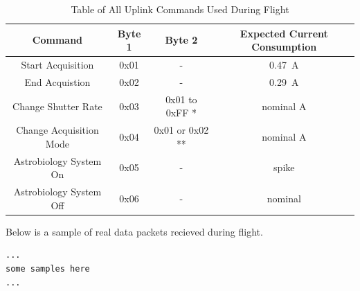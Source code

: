 \begin{table}[h!]
\centering
\caption{Table of All Uplink Commands Used During Flight}
\label{tab:All-Commands}
\bigskip
\begin{tabular}{c|c|c|c}
\hline
\hline
\multicolumn{1}{c|}{\bfseries Command} & \multicolumn{1}{c|}{\bfseries Byte 1} &  \multicolumn{1}{c|}{\bfseries Byte 2} & \multicolumn{1}{c}{\bfseries Expected Current Consumption} \\
\hline
    	Start Acquisition  	& 0x01	& -	 		& \SI{0.47}{\ampere}    \\ \hline
    	End Acquistion 		& 0x02	& -	 		& \SI{0.29}{\ampere}    \\ \hline
    	Change Shutter Rate 	& 0x03 	& 0x01 to 0xFF *	& nominal A 		\\ \hline
	Change Acquisition Mode	& 0x04	& 0x01 or 0x02 **	& nominal A		\\ \hline
	Astrobiology System On	& 0x05	& -			& spike			\\ \hline
	Astrobiology System Off	& 0x06	& -			& nominal		\\ \hline

\end{tabular}
\medskip
\end{table}

Below is a sample of real data packets recieved during flight. 

\lstset{basicstyle=\small, numbers=left, xleftmargin=2em, frame=tb, label = Downlinks, framexleftmargin=1.5em}
\begin{lstlisting}[caption = Sample of downlinked data packets ID: 15667 - 15670.]
...
some samples here
...
\end{lstlisting}

